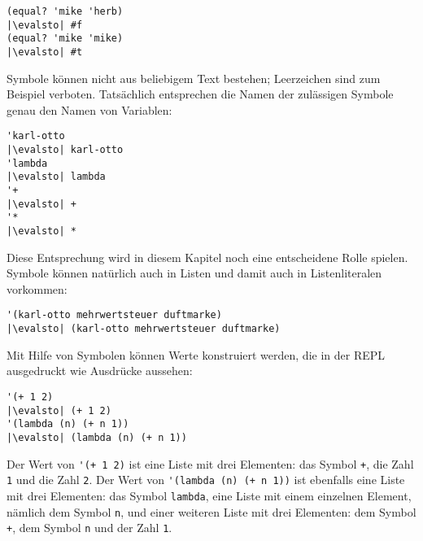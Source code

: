 \begin{lstlisting}
(equal? 'mike 'herb)
|\evalsto| #f
(equal? 'mike 'mike)
|\evalsto| #t
\end{lstlisting}
%
Symbole können nicht aus beliebigem Text bestehen;  
Leerzeichen sind zum Beispiel verboten.  Tatsächlich entsprechen die
Namen der zulässigen Symbole genau den Namen von Variablen:
%
\begin{lstlisting}
'karl-otto
|\evalsto| karl-otto
'lambda
|\evalsto| lambda
'+
|\evalsto| +
'*
|\evalsto| *
\end{lstlisting}
%
Diese Entsprechung wird in diesem Kapitel noch eine entscheidene Rolle
spielen.  Symbole können natürlich auch in Listen und damit auch in
Listenliteralen vorkommen:
%
\begin{lstlisting}
'(karl-otto mehrwertsteuer duftmarke)
|\evalsto| (karl-otto mehrwertsteuer duftmarke)
\end{lstlisting}
%
Mit Hilfe von Symbolen können Werte konstruiert werden, die in der REPL
ausgedruckt wie Ausdrücke aussehen:
%
\begin{lstlisting}
'(+ 1 2)
|\evalsto| (+ 1 2)
'(lambda (n) (+ n 1))
|\evalsto| (lambda (n) (+ n 1))
\end{lstlisting}
%
Der Wert von \verb|'(+ 1 2)| ist eine Liste mit drei
Elementen: das Symbol \verb|+|, die Zahl \lstinline{1} und die Zahl
\lstinline{2}.  Der Wert von \verb|'(lambda (n) (+ n 1))| ist ebenfalls
eine Liste mit drei Elementen: das Symbol \verb|lambda|, eine Liste
mit einem einzelnen Element, nämlich dem Symbol \lstinline{n}, und einer
weiteren Liste mit drei Elementen: dem Symbol \lstinline{+}, dem Symbol
\lstinline{n} und der Zahl \lstinline{1}.

